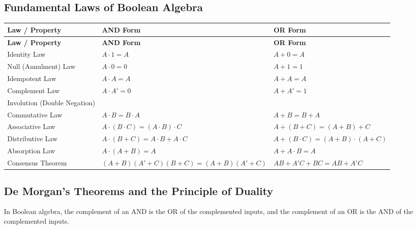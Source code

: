 \documentclass[12pt,a4paper]{article}
\renewcommand{\arraystretch}{1.45}
\begin{document}
\subsection{Fundamental Laws of Boolean Algebra}
\par\vspace{6pt}\noindent
\begingroup
\setlength{\tabcolsep}{4pt}
\setlength{\extrarowheight}{2.5pt}
\renewcommand{\arraystretch}{1.35}
\begingroup
\setlength{\LTleft}{0pt}
\setlength{\LTright}{0pt}
\begin{longtable}{|B{3.4cm}|>{\small\raggedright\arraybackslash}m{\dimexpr(\linewidth-3.4cm-6\arrayrulewidth)/2\relax}|>{\small\raggedright\arraybackslash}m{\dimexpr(\linewidth-3.4cm-6\arrayrulewidth)/2\relax}|}
\hline
\textbf{Law / Property} & \textbf{AND Form} & \textbf{OR Form} \\
\hline
\endfirsthead
\hline
\textbf{Law / Property} & \textbf{AND Form} & \textbf{OR Form} \\
\hline
\endhead
Identity Law & $A \cdot 1 = A$ & $A + 0 = A$ \\
\hline
Null (Annulment) Law & $A \cdot 0 = 0$ & $A + 1 = 1$ \\
\hline
Idempotent Law & $A \cdot A = A$ & $A + A = A$ \\
\hline
Complement Law & $A \cdot A' = 0$ & $A + A' = 1$ \\
\hline
Involution (Double Negation) &  \\
\hline
Commutative Law & $A \cdot B = B \cdot A$ & $A + B = B + A$ \\
\hline
Associative Law & $A \cdot (B \cdot C) = (A \cdot B) \cdot C$ & $A + (B + C) = (A + B) + C$ \\
\hline
Distributive Law & $A \cdot (B + C) = A \cdot B + A \cdot C$ & $A + (B \cdot C) = (A + B) \cdot (A + C)$ \\
\hline
Absorption Law & $A \cdot (A + B) = A$ & $A + A \cdot B = A$ \\
\hline
Consensus Theorem & $(A+B)(A'+C)(B+C) = (A+B)(A'+C)$ & $AB + A'C + BC = AB + A'C$ \\
\hline
\end{longtable}
\endgroup
\endgroup

\subsection{De Morgan's Theorems and the Principle of Duality}
\begin{tcolorbox}[defbox, title={De Morgan's Theorems}]
In Boolean algebra, the complement of an AND is the OR of the complemented inputs, and the complement of an OR is the AND of the complemented inputs.
\end{tcolorbox}
\end{document}
